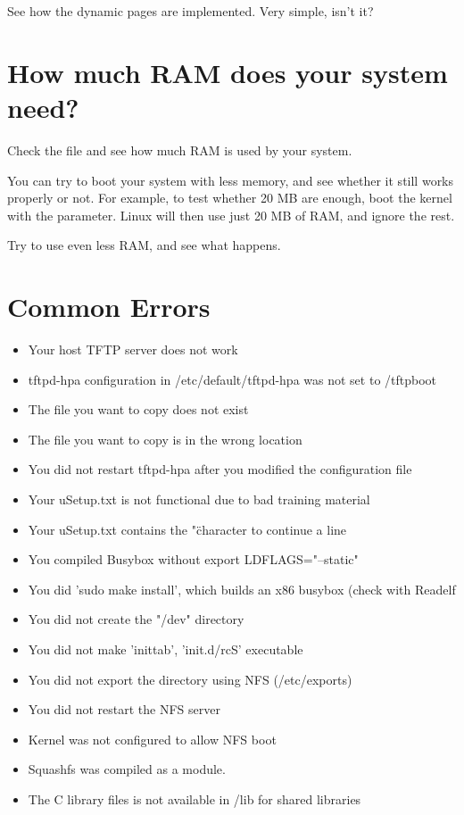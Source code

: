 See how the dynamic pages are implemented. Very simple, isn't it?

\section{How much RAM does your system need?}

Check the  file and see how much RAM is used by your
system.

You can try to boot your system with less memory, and see whether it
still works properly or not. For example, to test whether 20 MB are
enough, boot the kernel with the  parameter. Linux will then
use just 20 MB of RAM, and ignore the rest.

Try to use even less RAM, and see what happens.

\section{Common Errors}
\begin{itemize}
\item Your host TFTP server does not work
\item tftpd-hpa configuration in /etc/default/tftpd-hpa was not set to /tftpboot
\item The file you want to copy does not exist
\item The file you want to copy is in the wrong location
\item You did not restart tftpd-hpa after you modified the configuration file
\item Your uSetup.txt is not functional due to bad training material
\item Your uSetup.txt contains the "\" character to continue a line
\item You compiled Busybox without export LDFLAGS="--static"
\item You did 'sudo make install', which builds an x86 busybox (check with Readelf
\item You did not create the "/dev" directory
\item You did not make 'inittab', 'init.d/rcS' executable
\item You did not export the directory using NFS (/etc/exports)
\item You did not restart the NFS server
\item Kernel was not configured to allow NFS boot
\item Squashfs was compiled as a module.
\item The C library files is not available in /lib for shared libraries
\end{itemize}

